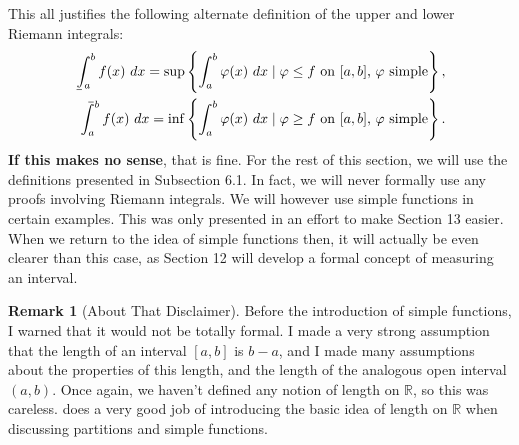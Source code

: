 \documentclass{article}
\def\upint{\mathchoice%
	{\mkern13mu\overline{\vphantom{\intop}\mkern7mu}\mkern-20mu}%
	{\mkern7mu\overline{\vphantom{\intop}\mkern7mu}\mkern-14mu}%
	{\mkern7mu\overline{\vphantom{\intop}\mkern7mu}\mkern-14mu}%
	{\mkern7mu\overline{\vphantom{\intop}\mkern7mu}\mkern-14mu}%
	\int}
\def\lowint{\mkern3mu\underline{\vphantom{\intop}\mkern7mu}\mkern-10mu\int}
\newcommand{\R}{\mathbb{R}}
\theoremstyle{definition}
\newtheorem{remark}{Remark}[section]
\begin{document}
	This all justifies the following alternate definition of the upper and lower Riemann integrals:
	\begin{align*}
		\lowint_a^b f(x)\ dx=\sup \left\{\int_a^b\varphi(x)\ dx\mid \varphi\le f\text{ on }[a,b]\text{, } \varphi\text{ simple}\right\},\\
		\upint_a^b f(x)\ dx=\inf\left\{\int_a^b\varphi(x)\ dx\mid \varphi\ge f\text{ on }[a,b]\text{, } \varphi\text{ simple}\right\}.
	\end{align*} 
	\textbf{\color{red}If this makes no sense}, that is fine. For the rest of this section, we will use the definitions presented in Subsection 6.1. In fact, we will never formally use any proofs involving Riemann integrals. We will however use simple functions in certain examples. This was only presented in an effort to make Section 13 easier. When we return to the idea of simple functions then, it will actually be even clearer than this case, as Section 12 will develop a formal concept of measuring an interval.  
	\begin{remark}[About That Disclaimer]
		Before the introduction of simple functions, I warned that it would not be totally formal. I made a very strong assumption that the length of an interval $ [a,b] $ is $ b-a $, and I made many assumptions about the properties of this length, and the length of the analogous open interval $ (a,b) $. Once again, we haven't defined any notion of length on $ \R $, so this was careless. \cite{tao2006analysis} does a very good job of introducing the basic idea of length on $ \R $ when discussing partitions and simple functions. 
	\end{remark}
\end{document}
